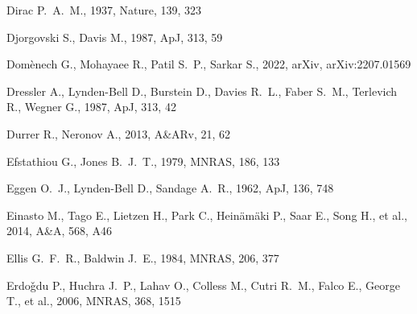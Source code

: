 \documentclass[fleqn,12pt]{article}
\begin{document}
\begin{thebibliography}{}
  Dirac P.~A.~M., 1937, Nature, 139, 323

 Djorgovski S., Davis M., 1987, ApJ, 313, 59

 Dom{\`e}nech G., Mohayaee R., Patil S.~P., Sarkar S., 2022, arXiv, arXiv:2207.01569

 Dressler A., Lynden-Bell D., Burstein D., Davies R.~L., Faber S.~M., Terlevich R., Wegner G., 1987, ApJ, 313, 42

 Durrer R., Neronov A., 2013, A\&ARv, 21, 62

 Efstathiou G., Jones B.~J.~T., 1979, MNRAS, 186, 133



 Eggen O.~J., Lynden-Bell D., Sandage A.~R., 1962, ApJ, 136, 748

 Einasto M., Tago E., Lietzen H., Park C., Hein{\"a}m{\"a}ki P., Saar E., Song H., et al., 2014, A\&A, 568, A46

 Ellis G.~F.~R., Baldwin J.~E., 1984, MNRAS, 206, 377

 Erdo{\v{g}}du P., Huchra J.~P., Lahav O., Colless M., Cutri R.~M., Falco E., George T., et al., 2006, MNRAS, 368, 1515




\end{thebibliography}
\end{document}
